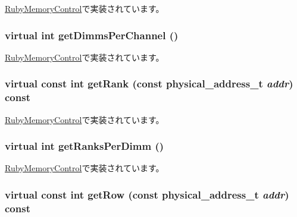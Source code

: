 \hyperlink{classRubyMemoryControl_a73da75c3e5ec30855a02eae2ba824e38}{RubyMemoryControl}で実装されています。\hypertarget{classMemoryControl_a6f39efbb6d1f061b2f6467ac33f6ce34}{
\subsubsection[{getDimmsPerChannel}]{\setlength{\rightskip}{0pt plus 5cm}virtual int getDimmsPerChannel ()}}
\label{classMemoryControl_a6f39efbb6d1f061b2f6467ac33f6ce34}


\hyperlink{classRubyMemoryControl_a5a9c0e20c20d0171bb8d8a96cb22576f}{RubyMemoryControl}で実装されています。\hypertarget{classMemoryControl_a22565804f54291d8c37b7456c157f814}{
\subsubsection[{getRank}]{\setlength{\rightskip}{0pt plus 5cm}virtual const int getRank (const {\bf physical\_\-address\_\-t} {\em addr}) const}}
\label{classMemoryControl_a22565804f54291d8c37b7456c157f814}


\hyperlink{classRubyMemoryControl_af8c39d7c9853a48fd242bda859e76222}{RubyMemoryControl}で実装されています。\hypertarget{classMemoryControl_a8fc5f029d5373799975a32fcd559400c}{
\subsubsection[{getRanksPerDimm}]{\setlength{\rightskip}{0pt plus 5cm}virtual int getRanksPerDimm ()}}
\label{classMemoryControl_a8fc5f029d5373799975a32fcd559400c}


\hyperlink{classRubyMemoryControl_a6dff017ebfbd9d5b021b86437ff67acc}{RubyMemoryControl}で実装されています。\hypertarget{classMemoryControl_a86eabafc0d8d68214de261fc7a333a04}{
\subsubsection[{getRow}]{\setlength{\rightskip}{0pt plus 5cm}virtual const int getRow (const {\bf physical\_\-address\_\-t} {\em addr}) const}}
\label{classMemoryControl_a86eabafc0d8d68214de261fc7a333a04}


